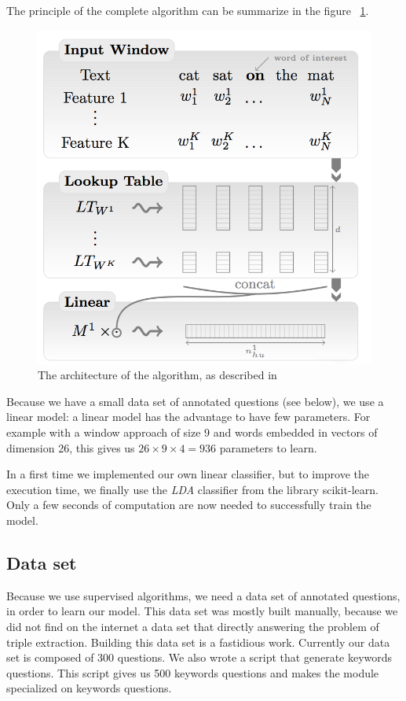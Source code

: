 The principle of the complete algorithm can be summarize in the figure ~\ref{sandalone:model}.

\begin{figure}[!ht]
  \centering
  \caption{The architecture of the algorithm, as described in \cite{collobert}}
  \label{sandalone:model}
    \includegraphics[scale=0.5]{../NLP-standalone-images/model.png}
\end{figure}

Because we have a small data set of annotated questions (see below), we use a linear model: a linear model has the advantage to have few parameters.
For example with a window approach of size 9 and words embedded in vectors of dimension 26,  this gives us $26\times 9\times 4 = 936$ parameters to learn.

In a first time we implemented our own linear classifier, but to improve the execution time, we finally use the \textit{LDA} classifier from the library scikit-learn. Only a few seconds of computation are now needed to successfully train the model.

\subsection{Data set}

Because we use supervised algorithms, we need a data set of annotated questions, in order to learn our model.
This data set was mostly built manually, because we did not find on the internet a data set that directly answering the problem of triple extraction.
Building this data set is a fastidious work. Currently our data set is composed of 300 questions.
We also wrote a script that generate keywords questions. This script gives us 500 keywords questions and makes the module specialized on keywords questions.

